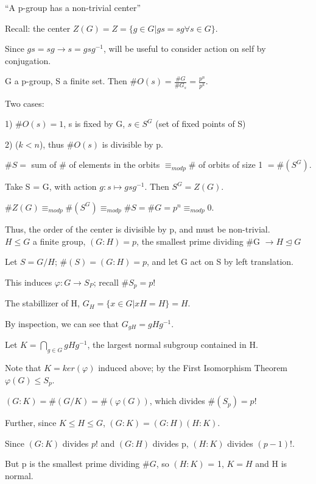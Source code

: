 \documentclass[12pt]{article}
\begin{document}
\noindent
``A p-group has a non-trivial center''

Recall: the center $Z(G) = Z = \{g \in G | gs = sg \forall s\in G\}$.

Since $gs = sg \to s = gsg^{-1}$, will be useful to consider action on self by conjugation.

\noindent
G a p-group, S a finite set.  Then $\#O(s) = \frac{\#G}{\#G_s} = \frac{p^n}{p^k}$.

\noindent
Two cases:

1) $\#O(s) = 1$, s is fixed by G, $s \in S^G$ (set of fixed points of S)

2) ($k < n$), thus $\#O(s)$ is divisible by p.

\noindent
$\#S =$ sum of \# of elements in the orbits $\equiv_{mod p} \#$ of orbits of size 1 $= \#(S^G)$.

Take S = G, with action $g: s \mapsto gsg^{-1}$.  Then $S^G = Z(G)$.

$\#Z(G) \equiv_{mod p} \#(S^G) \equiv_{mod p} \#S = \#G = p^n \equiv_{mod p} 0$.

Thus, the order of the center is divisible by p, and must be non-trivial.\\

\noindent
$H \leq G$ a finite group, $(G : H) = p$, the smallest prime dividing \#G $\to H \trianglelefteq G$

Let $S = G\slash H$; $\#(S) = (G : H) = p$, and let G act on S by left translation.

This induces $\varphi: G \to S_P$; recall $\#S_p = p!$

The stabillizer of H, $G_H = \{x \in G | xH = H\} = H$.

By inspection, we can see that $G_{gH} = gHg^{-1}$.

Let $K = \bigcap_{g \in G}gHg^{-1}$, the largest normal subgroup contained in H.

Note that $K = ker(\varphi)$ induced above; by the First Isomorphism Theorem $\varphi(G) \leq S_p$.

$(G : K) = \#(G\slash K) = \#(\varphi(G))$, which divides $\#(S_p) = p!$

Further, since $K \leq H \leq G$, $(G : K) = (G : H)(H : K)$.

Since $(G : K)$ divides $p!$ and $(G : H)$ divides p, $(H : K)$ divides $(p - 1)!$.

But p is the smallest prime dividing $\#G$, so $(H : K)$ = 1, $K = H$ and H is normal.\\
\end{document}
